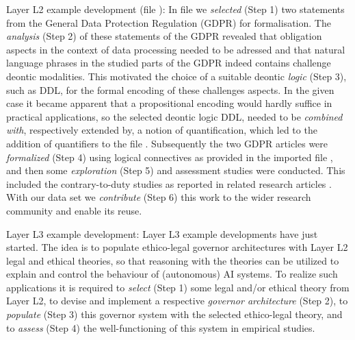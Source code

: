 \documentclass{article}
\begin{document}
\begin{description}
\item{Layer L2 example development (file \textsf{\small
      }):} In file \textsf{\small
    } we \textit{selected} (Step 1) two
  statements from the General Data Protection Regulation (GDPR) for
  formalisation. The \textit{analysis} (Step 2) of these statements of
  the GDPR revealed that obligation aspects in the context of data
  processing needed to be adressed and that natural language phrases
  in the studied parts of the GDPR indeed contains challenge deontic
  modalities. This motivated the choice of a suitable deontic
  \textit{logic} (Step 3), such as DDL, for the formal encoding of
  these challenges aspects. In the given case it became apparent that
  a propositional encoding would hardly suffice in practical applications, so the selected
  deontic logic DDL, needed to be \textit{combined with}, respectively
  extended by, a notion of quantification, which led to the addition of
  quantifiers to the file \textsf{\small
    }. Subsequently the two GDPR articles were
  \textit{formalized} (Step 4) using logical connectives as provided in the imported file \textsf{\small
    }, and then some \textit{exploration} (Step 5)
  and assessment studies were conducted. This included the
  contrary-to-duty studies as reported in related research articles
  \cite{J48,C71}. With our data set we \textit{contribute} (Step 6)
  this work to the wider research community and enable its reuse. 

\item{Layer L3 example development:}  Layer L3 example developments
  have just started. The idea is to populate ethico-legal governor
  architectures \cite{J48}
  with Layer L2 legal and ethical theories, so that reasoning with the
  theories can be utilized to explain and control the behaviour of
  (autonomous) AI systems. To realize such applications it is required
  to \textit{select} (Step 1) some legal and/or ethical theory from
  Layer L2, to
  devise and implement a respective \textit{governor architecture}
  (Step 2), to \textit{populate} (Step 3) this governor system with
  the selected ethico-legal theory, and to \textit{assess} (Step 4) the
  well-functioning of this system in empirical studies.
\end{description} 
\end{document}
